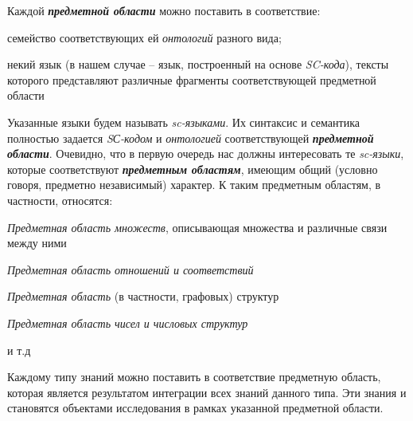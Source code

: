 \begin{SCn}
{Каждой \textbf{\textit{предметной области}} можно поставить в соответствие:
\begin{scnitemize}
    \item семейство соответствующих ей \textit{онтологий} разного вида;
    \item некий язык (в нашем случае – язык, построенный на основе \textit{SC-кода}), тексты которого представляют различные фрагменты соответствующей предметной области
\end{scnitemize}


Указанные языки будем называть \textit{sc-языками}. Их синтаксис и семантика полностью задается \textit{SС-кодом} и \textit{онтологией} соответствующей \textbf{\textit{предметной области}}. Очевидно, что в первую очередь нас должны интересовать те \textit{sc-языки}, которые соответствуют \textbf{\textit{предметным областям}}, имеющим общий (условно говоря, предметно независимый) характер. К таким предметным областям, в частности, относятся:
\begin{scnitemize}
    \item \textit{Предметная область множеств}, описывающая множества и различные связи между ними
    \item \textit{Предметная область отношений и соответствий}
    \item \textit{Предметная область} (в частности, графовых) структур
    \item \textit{Предметная область чисел и числовых структур}
    \item и т.д
\end{scnitemize}


Каждому типу знаний можно поставить в соответствие предметную область, которая является результатом интеграции всех знаний данного типа. Эти знания и становятся объектами исследования в рамках указанной предметной области.


}
\end{SCn}
